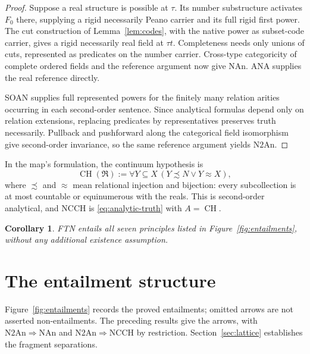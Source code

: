 \documentclass[11pt,letterpaper,numbers=noenddot]{scrartcl}
\numberwithin{equation}{section}
\newtheorem{corollary}[theorem]{Corollary}
\theoremstyle{definition}
\newcommand{\CH}{\operatorname{CH}}
\newcommand{\NAn}{\mathrm{NAn}}
\newcommand{\Ntwo}{\mathrm{N2An}}
\newcommand{\NCCH}{\mathrm{NCCH}}
\begin{document}
\begin{proof}
Suppose a real structure is possible at $\tau$. Its number substructure activates $F_0$ there, supplying a rigid necessarily Peano carrier and its full rigid first power. The cut construction of Lemma~\ref{lem:codes}, with the native power as subset-code carrier, gives a rigid necessarily real field at $\tau t$. Completeness needs only unions of cuts, represented as predicates on the number carrier. Cross-type categoricity of complete ordered fields \cite[Appendix C]{bacon} and the reference argument now give $\NAn$. ANA supplies the real reference directly.

SOAN supplies full represented powers for the finitely many relation arities occurring in each second-order sentence. Since analytical formulas depend only on relation extensions, replacing predicates by representatives preserves truth necessarily. Pullback and pushforward along the categorical field isomorphism give second-order invariance, so the same reference argument yields $\Ntwo$.
\end{proof}

In the map's formulation, the continuum hypothesis is
\begin{equation}\label{eq:ch}
\CH(\mathfrak R):=
\forall Y\subseteq X\,
 (Y\precsim N\lor Y\approx X),
\end{equation}
where $\precsim$ and $\approx$ mean relational injection and bijection: every subcollection is at most countable or equinumerous with the reals. This is second-order analytical, and $\NCCH$ is \eqref{eq:analytic-truth} with $A=\CH$.

\begin{corollary}\label{cor:all}
FTN entails all seven principles listed in Figure~\ref{fig:entailments}, without any additional existence assumption.
\end{corollary}

\section{The entailment structure}

Figure~\ref{fig:entailments} records the proved entailments; omitted arrows are not asserted non-entailments. The preceding results give the arrows, with $\Ntwo\Rightarrow\NAn$ and $\Ntwo\Rightarrow\NCCH$ by restriction. Section~\ref{sec:lattice} establishes the fragment separations.
\end{document}
